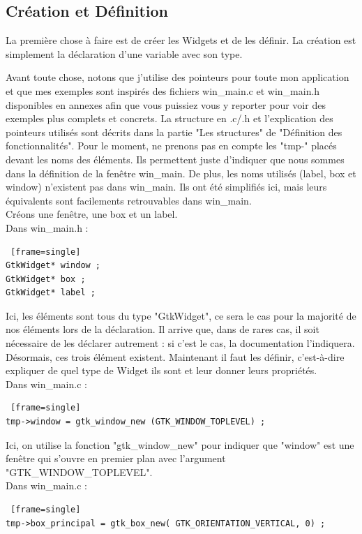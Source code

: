 \documentclass[11pt,french,a4paper]{report}
\begin{document}
        \subsection{Création et Définition}
La première chose à faire est de créer les Widgets et de les définir. La création est simplement la déclaration d'une variable 
avec son type. 

Avant toute chose, notons que j'utilise des pointeurs pour toute mon application et que mes exemples 
sont inspirés des fichiers win\_main.c et win\_main.h disponibles en annexes 
afin que vous puissiez vous y reporter pour voir des exemples plus complets et concrets. 
La structure en .c/.h et l'explication des pointeurs utilisés sont décrits dans la partie "Les structures" de 
"Définition des fonctionnalités". Pour le moment, ne prenons pas en compte les "tmp-\>" placés devant les noms des éléments.
Ils permettent juste d'indiquer que nous sommes dans la définition de la fenêtre win\_main.
De plus, les noms utilisés (label, box et window) n'existent pas dans win\_main. Ils ont été simplifiés ici, 
mais leurs équivalents sont facilements retrouvables dans win\_main.\\
Créons une fenêtre, une box et un label.\\
\small Dans win\_main.h : 
\begin{lstlisting} [frame=single]
GtkWidget* window ; 
GtkWidget* box ;   
GtkWidget* label ;  
\end{lstlisting}
Ici, les éléments sont tous du type "GtkWidget", ce sera le cas pour la majorité de nos éléments lors de la 
déclaration.
Il arrive que, dans de rares cas, il soit nécessaire de les déclarer autrement : si c'est le cas, la documentation l'indiquera. \\ 
Désormais, ces trois élément existent. Maintenant il faut les définir, c'est-à-dire expliquer de quel type de Widget ils sont 
et leur donner leurs propriétés. \\
\small Dans win\_main.c :
\begin{lstlisting} [frame=single]
tmp->window = gtk_window_new (GTK_WINDOW_TOPLEVEL) ;
\end{lstlisting}
Ici, on utilise la fonction "gtk\_window\_new" pour indiquer que "window" est une fenêtre qui s'ouvre en premier plan 
avec l'argument "GTK\_WINDOW\_TOPLEVEL". \\
\small Dans win\_main.c :
\begin{lstlisting} [frame=single]
tmp->box_principal = gtk_box_new( GTK_ORIENTATION_VERTICAL, 0) ;
\end{lstlisting}
\end{document}
